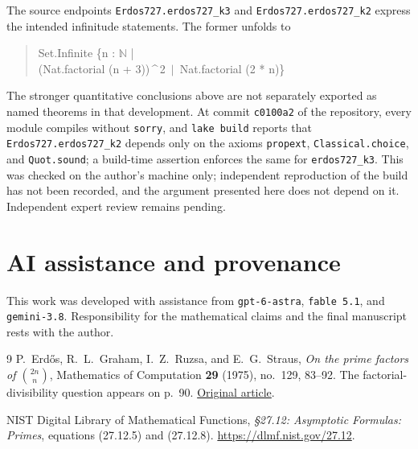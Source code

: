 \documentclass[11pt,a4paper]{article}
\newcommand{\N}{\mathbb N}
\newcommand{\1}{\mathbf 1}
\numberwithin{equation}{section}
\begin{document}
The source endpoints \texttt{Erdos727.erdos727\_k3} and
\texttt{Erdos727.erdos727\_k2} express the intended infinitude statements.
The former unfolds to
\begin{quote}\small\ttfamily
Set.Infinite \{n : \(\N\) |\\
\hspace*{1em}(Nat.factorial (n + 3))\,\^{}\,2\ \(\mid\)\ Nat.factorial (2 * n)\}
\end{quote}
The stronger quantitative conclusions above are not separately exported
as named theorems in that development. At commit \texttt{c0100a2} of the
repository, every module compiles without \texttt{sorry}, and \texttt{lake build}
reports that \texttt{Erdos727.erdos727\_k2} depends only on the axioms
\texttt{propext}, \texttt{Classical.choice}, and \texttt{Quot.sound}; a
build-time assertion enforces the same for \texttt{erdos727\_k3}. This
was checked on the author's machine only; independent reproduction of the
build has not been recorded, and the argument presented here does not depend
on it. Independent expert review remains pending.

\section*{AI assistance and provenance}

This work was developed with assistance from \texttt{gpt-6-astra},
\texttt{fable 5.1}, and \texttt{gemini-3.8}. Responsibility for the
mathematical claims and the final manuscript rests with the author.

\begin{thebibliography}{9}
P.~Erd\H{o}s, R.~L.~Graham, I.~Z.~Ruzsa, and E.~G.~Straus,
\emph{On the prime factors of \(\binom{2n}{n}\)},
Mathematics of Computation \textbf{29} (1975), no.~129, 83--92.
The factorial-divisibility question appears on p.~90.
\href{https://www.renyi.hu/~p_erdos/1975-27.pdf}{Original article}.

NIST Digital Library of Mathematical Functions,
\emph{\S27.12: Asymptotic Formulas: Primes},
equations (27.12.5) and (27.12.8).
\url{https://dlmf.nist.gov/27.12}.
\end{thebibliography}
\end{document}

